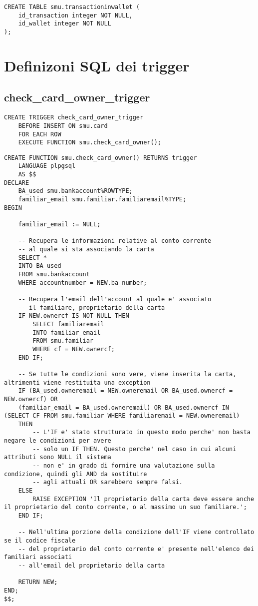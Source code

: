 \begin{lstlisting}[tabsize=2]
CREATE TABLE smu.transactioninwallet (
    id_transaction integer NOT NULL,
    id_wallet integer NOT NULL
);
\end{lstlisting}

\newpage

\section{Definizoni SQL dei trigger}

\subsection{check\_card\_owner\_trigger}

\begin{lstlisting}[tabsize=2]
CREATE TRIGGER check_card_owner_trigger
    BEFORE INSERT ON smu.card
    FOR EACH ROW
    EXECUTE FUNCTION smu.check_card_owner();
\end{lstlisting}

\begin{lstlisting}[tabsize=2]
    CREATE FUNCTION smu.check_card_owner() RETURNS trigger
    LANGUAGE plpgsql
    AS $$
DECLARE
    BA_used smu.bankaccount%ROWTYPE;
    familiar_email smu.familiar.familiaremail%TYPE;
BEGIN

    familiar_email := NULL;

    -- Recupera le informazioni relative al conto corrente
    -- al quale si sta associando la carta
    SELECT *
    INTO BA_used
    FROM smu.bankaccount
    WHERE accountnumber = NEW.ba_number;

    -- Recupera l'email dell'account al quale e' associato
    -- il familiare, proprietario della carta
    IF NEW.ownercf IS NOT NULL THEN
        SELECT familiaremail
        INTO familiar_email
        FROM smu.familiar
        WHERE cf = NEW.ownercf;
    END IF;

    -- Se tutte le condizioni sono vere, viene inserita la carta, altrimenti viene restituita una exception
    IF (BA_used.owneremail = NEW.owneremail OR BA_used.ownercf = NEW.ownercf) OR
    (familiar_email = BA_used.owneremail) OR BA_used.ownercf IN (SELECT CF FROM smu.familiar WHERE familiaremail = NEW.owneremail)
    THEN
        -- L'IF e' stato strutturato in questo modo perche' non basta negare le condizioni per avere
        -- solo un IF THEN. Questo perche' nel caso in cui alcuni attributi sono NULL il sistema
        -- non e' in grado di fornire una valutazione sulla condizione, quindi gli AND da sostituire
        -- agli attuali OR sarebbero sempre falsi.
    ELSE
        RAISE EXCEPTION 'Il proprietario della carta deve essere anche il proprietario del conto corrente, o al massimo un suo familiare.';
    END IF;

    -- Nell'ultima porzione della condizione dell'IF viene controllato se il codice fiscale
    -- del proprietario del conto corrente e' presente nell'elenco dei familiari associati
    -- all'email del proprietario della carta

    RETURN NEW;
END;
$$;
\end{lstlisting}


